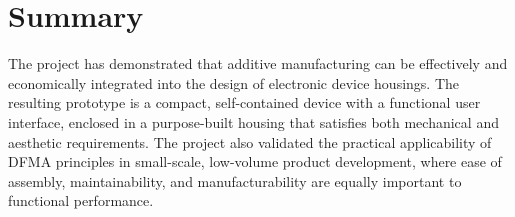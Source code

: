 \section{Summary}

The project has demonstrated that additive manufacturing can be effectively and economically integrated into the design of electronic device housings. The resulting prototype is a compact, self-contained device with a functional user interface, enclosed in a purpose-built housing that satisfies both mechanical and aesthetic requirements. The project also validated the practical applicability of DFMA principles in small-scale, low-volume product development, where ease of assembly, maintainability, and manufacturability are equally important to functional performance.


